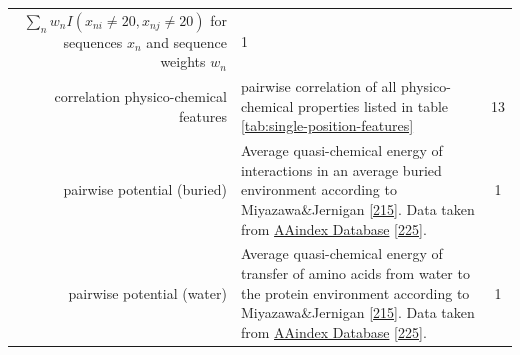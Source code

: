 \documentclass[11pt,a4paper,twoside]{book}
\theoremstyle{definition}
\theoremstyle{definition}
\theoremstyle{remark}
\begin{document}
\begin{longtable}[]{@{}rlc@{}}
\begin{minipage}[t]{0.50\columnwidth}
\(\sum_n w_n I(x_{ni} \! \neq \! 20, x_{nj} \! \neq \! 20)\) for
sequences \(x_n\) and sequence weights \(w_n\)\strut
\end{minipage} & \begin{minipage}[t]{0.18\columnwidth}\centering\strut
1\strut
\end{minipage}\tabularnewline
\begin{minipage}[t]{0.23\columnwidth}\raggedleft\strut
correlation physico-chemical features\strut
\end{minipage} & \begin{minipage}[t]{0.50\columnwidth}\raggedright\strut
pairwise correlation of all physico-chemical properties listed in table
\ref{tab:single-position-features}\strut
\end{minipage} & \begin{minipage}[t]{0.18\columnwidth}\centering\strut
13\strut
\end{minipage}\tabularnewline
\begin{minipage}[t]{0.23\columnwidth}\raggedleft\strut
pairwise potential (buried)\strut
\end{minipage} & \begin{minipage}[t]{0.50\columnwidth}\raggedright\strut
Average quasi-chemical energy of interactions in an average buried
environment according to Miyazawa\&Jernigan
{[}\protect\hyperlink{ref-Miyazawa1999a}{215}{]}. Data taken from
\href{http://www.genome.jp/dbget-bin/www_bget?aaindex:MIYS990107}{AAindex
Database} {[}\protect\hyperlink{ref-Kawashima2008}{225}{]}.\strut
\end{minipage} & \begin{minipage}[t]{0.18\columnwidth}\centering\strut
1\strut
\end{minipage}\tabularnewline
\begin{minipage}[t]{0.23\columnwidth}\raggedleft\strut
pairwise potential (water)\strut
\end{minipage} & \begin{minipage}[t]{0.50\columnwidth}\raggedright\strut
Average quasi-chemical energy of transfer of amino acids from water to
the protein environment according to Miyazawa\&Jernigan
{[}\protect\hyperlink{ref-Miyazawa1999a}{215}{]}. Data taken from
\href{http://www.genome.jp/dbget-bin/www_bget?aaindex:MIYS990106}{AAindex
Database} {[}\protect\hyperlink{ref-Kawashima2008}{225}{]}.\strut
\end{minipage} & \begin{minipage}[t]{0.18\columnwidth}\centering\strut
1\strut
\end{minipage}\tabularnewline

\end{longtable}
\end{document}
